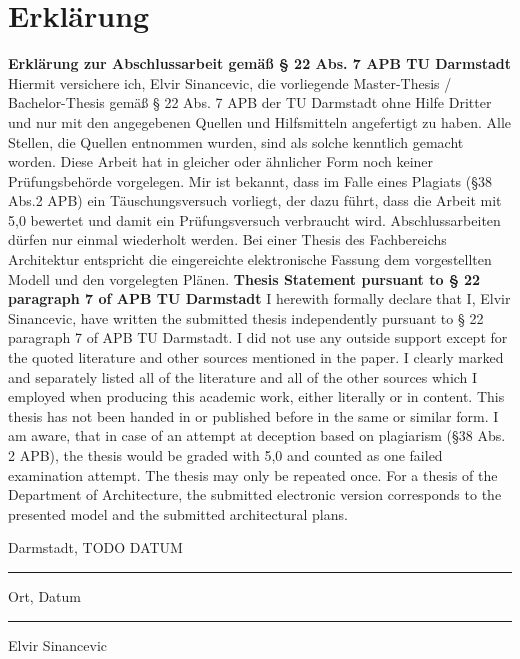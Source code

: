 \chapter*{Erklärung}\label{cha:Erklärung}
\textbf{Erklärung zur Abschlussarbeit gemäß § 22 Abs. 7 APB TU Darmstadt}
\newline\newline
Hiermit versichere ich, Elvir Sinancevic, die vorliegende Master-Thesis / Bachelor-Thesis gemäß § 22 Abs. 7 APB der TU Darmstadt ohne Hilfe Dritter und nur mit den angegebenen Quellen und Hilfsmitteln angefertigt zu haben. Alle Stellen, die Quellen entnommen wurden, sind als solche kenntlich gemacht worden. Diese Arbeit hat in gleicher oder ähnlicher Form noch keiner Prüfungsbehörde vorgelegen. 
\newline\newline
Mir ist bekannt, dass im Falle eines Plagiats (§38 Abs.2 APB) ein Täuschungsversuch vorliegt, der dazu führt, dass die Arbeit mit 5,0 bewertet und damit ein Prüfungsversuch verbraucht wird. Abschlussarbeiten dürfen nur einmal wiederholt werden.
\newline\newline
Bei einer Thesis des Fachbereichs Architektur entspricht die eingereichte elektronische Fassung dem vorgestellten Modell und den vorgelegten Plänen.
\newline\newline
\newline\newline
\textbf{Thesis Statement pursuant to § 22 paragraph 7 of APB TU Darmstadt}
\newline\newline
I herewith formally declare that I, Elvir Sinancevic, have written the submitted thesis independently pursuant to § 22 paragraph 7 of APB TU Darmstadt. I did not use any outside support except for the quoted literature and other sources mentioned in the paper. I clearly marked and separately listed all of the literature and all of the other sources which I employed when producing this academic work, either literally or in content. This thesis has not been handed in or published before in the same or similar form.
\newline\newline
I am aware, that in case of an attempt at deception based on plagiarism (§38 Abs. 2 APB), the thesis would be graded with 5,0 and counted as one failed examination attempt. The thesis may only be repeated once.
\newline\newline
For a thesis of the Department of Architecture, the submitted electronic version corresponds to the presented model and the submitted architectural plans.
\newline\newline
\newline\newline
\parbox{5cm}{\centering Darmstadt, TODO DATUM\hrule
	\strut \centering\footnotesize Ort, Datum} \hfill\parbox{5cm}{\hrule
	\strut \centering\footnotesize Elvir Sinancevic}